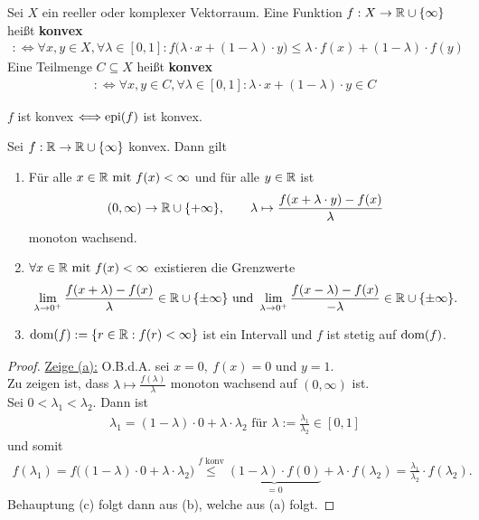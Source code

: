 \begin{definition}
Sei $X$ ein reeller oder komplexer Vektorraum. Eine Funktion $f:X\to\mathbb{R}\cup\lbrace\infty\rbrace$ heißt \textbf{konvex}
\begin{align*}
:\Longleftrightarrow
\forall x,y\in X,\forall\lambda\in[0,1]:f\big(\lambda\cdot x+(1-\lambda)\cdot y\big)
\leq\lambda\cdot f(x)+(1-\lambda)\cdot f(y) 
\end{align*}
Eine Teilmenge $C\subseteq X$ heißt \textbf{konvex}
\begin{align*}
:\Longleftrightarrow
\forall x,y\in C,\forall\lambda\in[0,1]:\lambda\cdot x+(1-\lambda)\cdot y\in C
\end{align*}
\end{definition}

\begin{lemma}
$f$ ist konvex $\Longleftrightarrow\text{epi}(f)$ ist konvex.
\end{lemma}

\begin{lemma}
Sei $f:\mathbb{R}\to\mathbb{R}\cup\lbrace\infty\rbrace$ konvex. Dann gilt
\begin{enumerate}[label=(\alph*)]
\item Für alle $x\in\mathbb{R}\text{ mit } f(x)<\infty$ und für alle $y\in\mathbb{R}$ ist
\begin{align*}
(0,\infty)\to\mathbb{R}\cup\lbrace +\infty\rbrace,\qquad
\lambda\mapsto\frac{f(x+\lambda\cdot y)-f(x)}{\lambda}
\end{align*}
monoton wachsend.
\item $\forall x\in\mathbb{R}\text{ mit } f(x)<\infty$ existieren die Grenzwerte
\begin{align*}
\lim\limits_{\lambda\to0^+}\frac{f(x+\lambda)-f(x)}{\lambda}\in\mathbb{R}\cup\lbrace\pm\infty\rbrace
\text{ und }
\lim\limits_{\lambda\to0^+}\frac{f(x-\lambda)-f(x)}{-\lambda}\in\mathbb{R}\cup\lbrace\pm\infty\rbrace.
\end{align*}
\item 
$\begin{aligned}
\text{dom}(f):=\lbrace r\in\mathbb{R}:f(r)<\infty\rbrace
\end{aligned}$ 
ist ein Intervall und $f$ ist stetig auf $\text{dom}(f)$.
\end{enumerate}
\end{lemma}
\begin{proof}
\underline{Zeige (a):} O.B.d.A. sei $x=0,~f(x)=0$ und $y=1$.\\
Zu zeigen ist, dass $\lambda\mapsto\frac{f(\lambda)}{\lambda}$ monoton wachsend auf $(0,\infty)$ ist.\\
Sei $0<\lambda_1<\lambda_2$. Dann ist 
\begin{align*}
\lambda_1=(1-\lambda)\cdot 0+\lambda\cdot\lambda_2\text{ für }\lambda:=\frac{\lambda_1}{\lambda_2}\in[0,1]
\end{align*}
und somit
\begin{align*}
f(\lambda_1)
=
f\Big((1-\lambda)\cdot0+\lambda\cdot\lambda_2\Big)
\stackrel{f\text{ konv}}{\leq}
\underbrace{(1-\lambda)\cdot f(0)}_{=0}+\lambda\cdot f(\lambda_2)
=
\frac{\lambda_1}{\lambda_2}\cdot f(\lambda_2).
\end{align*}
Behauptung (c) folgt dann aus (b), welche aus (a) folgt.
\end{proof}

